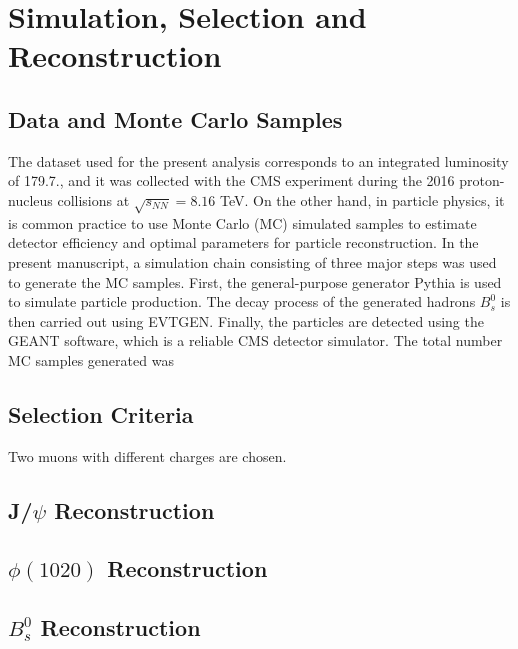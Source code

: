 \chapter[\leavevmode\newline Simulation, Selection and Reconstruction]{Simulation, Selection and Reconstruction}
\label{chap:Chapter_3}
\section{Data and Monte Carlo Samples}
The dataset used for the present analysis corresponds to
an integrated luminosity of 179.7., and it was collected with the CMS experiment during the 2016 proton-nucleus collisions at $\sqrt{s_{NN}} = 8.16$ TeV. On the other hand, in particle physics, it is common practice to use Monte Carlo (MC) simulated samples to estimate detector efficiency and optimal parameters for particle reconstruction. In the present manuscript, a simulation chain consisting of three major steps was used to generate the MC samples. First, the general-purpose generator Pythia is used to simulate particle production. The decay process of the generated hadrons $B^0_s$ is then carried out using EVTGEN. Finally, the particles are detected using the GEANT software, which is a reliable CMS detector simulator. The total number MC samples generated was 
\section{Selection Criteria}%
Two muons with different charges are chosen.
\section{J/$\psi$ Reconstruction}
\section{$\phi(1020)$ Reconstruction}
\section{$B_s^0$ Reconstruction}
\lipsum[3]